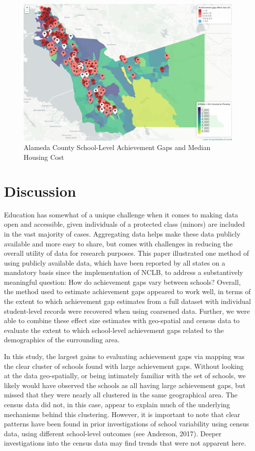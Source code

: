 \documentclass[man, fleqn, noextraspace]{apa6}
\theoremstyle{definition}
\theoremstyle{definition}
\theoremstyle{definition}
\theoremstyle{remark}
\begin{document}
\begin{figure}
\centering
\includegraphics{anderson_ncme18_files/screen_caps/poverty.png}
\caption{Alameda County School-Level Achievement Gaps and Median Housing
Cost}
\end{figure}

\hypertarget{discussion}{%
\section{Discussion}\label{discussion}}

Education has somewhat of a unique challenge when it comes to making
data open and accessible, given individuals of a protected class
(minors) are included in the vast majority of cases. Aggregating data
helps make these data publicly available and more easy to share, but
comes with challenges in reducing the overall utility of data for
research purposes. This paper illustrated one method of using publicly
available data, which have been reported by all states on a mandatory
basis since the implementation of NCLB, to address a substantively
meaningful question: How do achievement gaps vary between schools?
Overall, the method used to estimate achievement gaps appeared to work
well, in terms of the extent to which achievement gap estimates from a
full dataset with individual student-level records were recovered when
using coarsened data. Further, we were able to combine these effect size
estimates with geo-spatial and census data to evaluate the extent to
which school-level achievement gaps related to the demographics of the
surrounding area.

In this study, the largest gains to evaluating achievement gaps via
mapping was the clear cluster of schools found with large achievement
gaps. Without looking at the data geo-spatially, or being intimately
familiar with the set of schools, we likely would have observed the
schools as all having large achievement gaps, but missed that they were
nearly all clustered in the same geographical area. The census data did
not, in this case, appear to explain much of the underlying mechanisms
behind this clustering. However, it is important to note that clear
patterns have been found in prior investigations of school variability
using census data, using different school-level outcomes (see Anderson,
2017). Deeper investigations into the census data may find trends that
were not apparent here.
\end{document}
